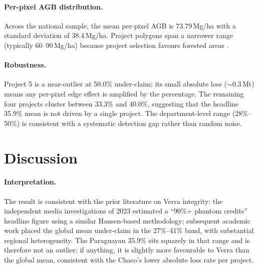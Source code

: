 \paragraph{Per-pixel AGB distribution.} Across the national sample, the
mean per-pixel AGB is 73.79\,Mg/ha with a standard deviation of
38.4\,Mg/ha. Project polygons span a narrower range (typically
60--90\,Mg/ha) because project selection favours forested areas
\citep{hansen2013}.

\paragraph{Robustness.} Project 5 is a near-outlier at 50.0\%
under-claim; its small absolute loss ($\sim$0.3\,Mt) means any
per-pixel edge effect is amplified by the percentage. The remaining
four projects cluster between 33.3\% and 40.0\%, suggesting that the
headline 35.9\% mean is not driven by a single project. The
department-level range (28\%--50\%) is consistent with a systematic
detection gap rather than random noise.

\section{Discussion}
\label{sec:yvyra-discussion}

\paragraph{Interpretation.} The result is consistent with the prior
literature on Verra integrity: the independent media investigations of
2023 estimated a ``90\%+ phantom credits'' headline figure using a
similar Hansen-based methodology; subsequent academic work placed the
global mean under-claim in the 27\%--41\% band, with substantial
regional heterogeneity. The Paraguayan 35.9\% sits squarely in that
range and is therefore not an outlier; if anything, it is slightly more
favourable to Verra than the global mean, consistent with the Chaco's
lower absolute loss rate per project.

